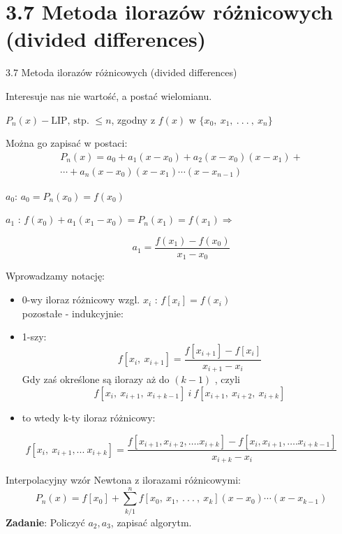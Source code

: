 \section{3.7 Metoda ilorazów różnicowych (divided differences)}
\begin{frame}
{3.7 Metoda ilorazów różnicowych (divided differences)}

Interesuje nas nie wartość, a postać wielomianu.

$P_{n}(x)-\text{LIP, stp. } \leq n$, zgodny z $f(x)$ w $\{x_{0},\ x_{1},\ .\ .\ .\ ,\ x_{n}\}$

Można go zapisać w postaci:
\begin{equation*}\begin{split}
P_{n}(x)=a_{0}+a_{1}(x-x_{0})+a_{2}(x-x_{0})(x-x_{1})+ \\
\cdots+a_{n}(x-x_{0})(x-x_{1})\cdots(x-x_{n-1})
\end{split}
\end{equation*}

$a_{0}$: $a_{0}=P_{n}(x_{0})=f(x_{0})$

$a_{1}$ : $f(x_{0})+a_{1}(x_{1}-x_{0})=P_{n}(x_{1})=f(x_{1}) \Rightarrow$

$$
a_{1}=\frac{f(x_{1})-f(x_{0})}{x_{1}-x_{0}}
$$
\end{frame}

\begin{frame}
Wprowadzamy notację:
\begin{itemize}
\item 0-wy iloraz różnicowy wzgl. $x_{i}$ : $f[x_{i}]=f(x_{i})$ \\
pozostałe - indukcyjnie:

\item 1-szy:
$$
f[x_{i},\ x_{i+1}]=\frac{f[x_{i+1}]-f[x_{i}]}{x_{i+1}-x_{i}}
$$
Gdy zaś określone są ilorazy aż do $(k-1)$ , czyli
$$
f[x_{i},\ x_{i+1},\ x_{i+k-1}] \: i \: f[x_{i+1},\ x_{i+2},\ x_{i+k}]
$$
\item to wtedy k-ty iloraz różnicowy:
\end{itemize}
$$
f[x_{i},\ x_{i+1}, ...\ x_{i+k}]=\frac{f[x_{i+1},x_{i+2},\ldots.x_{i+k}]-f[x_{i},x_{i+1},\ldots.x_{i+k-1}]}{x_{i+k}-x_{i}}
$$
\end{frame}

\begin{frame}
Interpolacyjny wzór Newtona z ilorazami różnicowymi:
$$
P_{n}(x)=f[x_{0}]+\sum_{k/1}^{n}f[x_{0},\ x_{1},\ .\ .\ .\ ,\ x_{k}](x-x_{0})\cdots(x-x_{k-1})
$$
\textbf{Zadanie}: Policzyć $a_{2}, a_{3}$, zapisać algorytm.

\end{frame}

